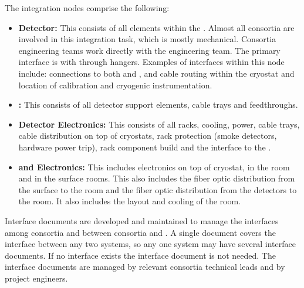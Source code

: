 The integration nodes comprise the following:
\begin{itemize}
\item {\bf Detector:} This consists of all  elements within
  the . Almost all consortia are involved in this
  integration task, which is mostly mechanical. Consortia engineering
  teams work directly with the  engineering team.  The
  primary interface is with  through hangers. Examples of
  interfaces within this node include:  connections to both
   and ,  and  cable
  routing within the cryostat and location of calibration and
  cryogenic instrumentation.
\item {\bf {}:} This consists of all detector support elements,
  cable trays and feedthroughs.
\item {\bf Detector Electronics:} This consists of all racks, cooling, power, cable
  trays, cable distribution on top of cryostats, rack protection
  (smoke detectors, hardware power trip), rack component build and the interface to
  the .
\item {\bf {} and Electronics:} This includes electronics on top of cryostat,
  in the  room and in the surface rooms. This also includes the  fiber optic distribution from
  the surface to the  room and the fiber optic distribution from the
  detectors to the  room. It also includes the layout and cooling of the 
  room.
\end{itemize}

Interface documents are developed and maintained to manage the
interfaces among consortia and between consortia and . A
single document covers the interface between any two systems, so any
one system may have several interface documents. If no interface
exists the interface document is not needed. The
interface documents are managed by relevant consortia technical leads
and by  project engineers.

